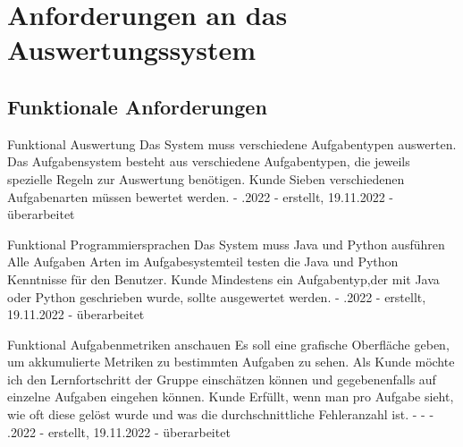 
\section*{Anforderungen an das Auswertungssystem}

\subsection*{Funktionale Anforderungen}

\begin{myreq}
    \reqtype Funktional
    \reqevent Auswertung
  \reqdesc Das System muss verschiedene Aufgabentypen auswerten.
  \reqrat Das Aufgabensystem besteht aus verschiedene Aufgabentypen,
die jeweils spezielle Regeln zur Auswertung benötigen.
  \reqorig Kunde
  \reqfit Sieben verschiedenen Aufgabenarten müssen bewertet werden.
  \twoinline
  \reqdep 
  \reqconf
  \reqmater -
  .2022 - erstellt, 19.11.2022 - überarbeitet
\end{myreq}

\begin{myreq}
  
    \reqtype Funktional
    \reqevent Programmiersprachen
  \reqdesc Das System muss Java und Python ausführen
  \reqrat Alle Aufgaben Arten im Aufgabesystemteil testen die Java und Python Kenntnisse für den Benutzer.
  \reqorig Kunde
  \reqfit Mindestens ein Aufgabentyp,der mit Java oder Python geschrieben wurde, sollte ausgewertet werden.
  \twoinline
  \reqdep 
  \reqconf
  \reqmater -
  .2022 - erstellt, 19.11.2022 - überarbeitet
\end{myreq}

\begin{myreq}
  \threeinline
    {}
    {\reqtype Funktional}
    {\reqevent Aufgabenmetriken anschauen}
  \reqdesc Es soll eine grafische Oberfläche geben, um akkumulierte Metriken zu bestimmten Aufgaben zu sehen.
  \reqrat Als Kunde möchte ich den Lernfortschritt der Gruppe einschätzen können und gegebenenfalls auf einzelne Aufgaben eingehen können.
  \reqorig Kunde
  \reqfit Erfüllt, wenn man pro Aufgabe sieht, wie oft diese gelöst wurde und was die durchschnittliche Fehleranzahl ist.
  \twoinline
    {}
    {}
  \twoinline
  {\reqdep -}
  {\reqconf -}
  \reqmater -
  .2022 - erstellt, 19.11.2022 - überarbeitet
\end{myreq}

